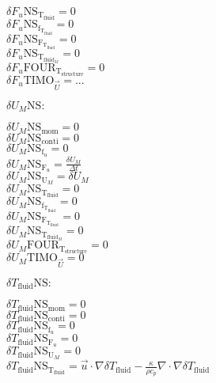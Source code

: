 \documentclass[10pt]{article} %
\begin{document}
\begin{center}
	$\delta F_u \text{NS}_{\text{T}_{\text{fluid}}} = 0$\\
	$\delta F_u \text{NS}_{\text{f}_{\text{T}_{\text{fluid}}}} = 0$\\
	$\delta F_u \text{NS}_{\text{F}_{\text{T}_{\text{fluid}}}} = 0$\\
	$\delta F_u \text{NS}_{\text{T}_{\text{fluid}_M}} = 0$\\
	$\delta F_u \text{FOUR}_{\text{T}_{\text{structure}}} = 0$\\
	$\delta F_u \text{TIMO}_{\vec{U}} = ...$\\
\begin{flushleft}
	$\delta U_M \text{NS}:$
\end{flushleft}
	$\delta U_M \text{NS}_{\text{mom}} =  0$\\
	$\delta U_M \text{NS}_{\text{conti}} = 0$\\
	$\delta U_M \text{NS}_{\text{f}_u} = 0$\\
	$\delta U_M \text{NS}_{\text{F}_u} = \frac{\delta U_M}{\Delta t}$\\
	$\delta U_M \text{NS}_{\text{U}_M} = \delta U_M$\\
	$\delta U_M \text{NS}_{\text{T}_{\text{fluid}}} = 0$\\
	$\delta U_M \text{NS}_{\text{f}_{\text{T}_{\text{fluid}}}} = 0$\\
	$\delta U_M \text{NS}_{\text{F}_{\text{T}_{\text{fluid}}}} = 0$\\
	$\delta U_M \text{NS}_{\text{T}_{\text{fluid}_M}} = 0$\\
	$\delta U_M \text{FOUR}_{\text{T}_{\text{structure}}} = 0$\\
	$\delta U_M \text{TIMO}_{\vec{U}} = 0$\\
\begin{flushleft}
	$\delta T_{\text{fluid}} \text{NS}:$
\end{flushleft}
	$\delta T_{\text{fluid}} \text{NS}_{\text{mom}} =  0$\\
	$\delta T_{\text{fluid}} \text{NS}_{\text{conti}} = 0$\\
	$\delta T_{\text{fluid}} \text{NS}_{\text{f}_u} = 0$\\
	$\delta T_{\text{fluid}} \text{NS}_{\text{F}_u} = 0$\\
	$\delta T_{\text{fluid}} \text{NS}_{\text{U}_M} = 0$\\
	$\delta T_{\text{fluid}} \text{NS}_{\text{T}_{\text{fluid}}} =  \vec{u} \cdot \nabla \delta T_{\text{fluid}} - \frac{\kappa}{\rho c_p} \nabla \cdot \nabla \delta T_{\text{fluid}}$\\

\end{center}
\end{document}
